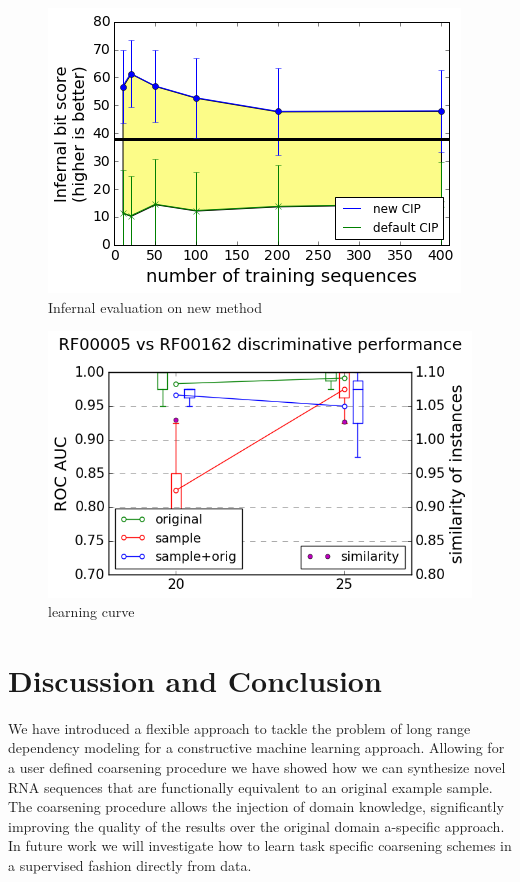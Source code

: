 \documentclass{article}
\begin{document}
\begin{figure}[ht]
      \centering
        \includegraphics[width=0.5\linewidth]{images/infernal_abstr.png}
      \caption{Infernal evaluation on new method}
      \label{infeval}
\end{figure}

\begin{figure}[ht]
      \centering
        \includegraphics[width=0.5\linewidth]{images/learningcurve.png}
      \caption{learning curve}
      \label{learncurve}
\end{figure}



\section{Discussion and Conclusion}

We have introduced a flexible approach to tackle the problem of long range
dependency modeling for a constructive machine learning approach. Allowing for
a user defined coarsening procedure we have showed how we can synthesize novel
RNA sequences that are functionally equivalent to an original example sample.
The coarsening procedure allows the injection of domain knowledge,
significantly improving the quality of the results over the original domain a-specific approach. In future work we will investigate how to learn task
specific coarsening schemes in a supervised fashion directly from data.



\end{document}
